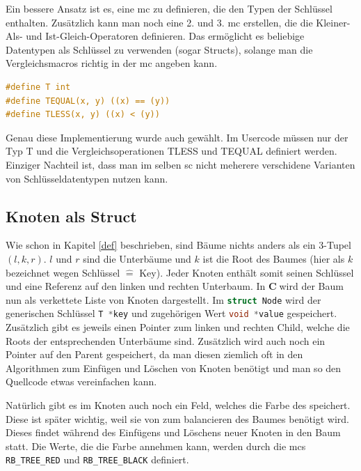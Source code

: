\documentclass[11pt]{article}
\newcommand{\lstin}[1]{\lstinline[language=C]{#1}}
\newcommand{\cpl}{\textbf{C}$\;$}
\begin{document}
Ein bessere Ansatz ist es, eine \gls{mc} zu definieren, die den Typen der Schlüssel enthalten. Zusätzlich kann man noch eine 2. und 3. \gls{mc} erstellen, die die Kleiner-Als- und Ist-Gleich-Operatoren definieren.
Das ermöglicht es beliebige Datentypen als Schlüssel zu verwenden (sogar Structs), solange man die Vergleichsmacros richtig in der \gls{mc} angeben kann.

\begin{lstlisting}[language=C]
#define T int
#define TEQUAL(x, y) ((x) == (y))
#define TLESS(x, y) ((x) < (y))
\end{lstlisting}

Genau diese Implementierung wurde auch gewählt. Im Usercode müssen nur der Typ T und die Vergleichsoperationen TLESS und TEQUAL definiert werden. Einziger Nachteil ist, dass man im selben \gls{sc} nicht meherere verschidene Varianten von Schlüsseldatentypen nutzen kann.

\subsection{Knoten als Struct}
Wie schon in Kapitel \ref{def} beschrieben, sind Bäume nichts anders als ein 3-Tupel $(l, k, r)$.
$l$ und $r$ sind die Unterbäume und $k$ ist die Root des Baumes (hier als $k$ bezeichnet wegen Schlüssel $\widehat{=}$ Key).
Jeder Knoten enthält somit seinen Schlüssel und eine Referenz auf den linken und rechten Unterbaum.
In \cpl wird der Baum nun als verkettete Liste von Knoten dargestellt.
Im \lstin{struct Node} wird der generischen Schlüssel \lstin{T *key} und zugehörigen Wert \lstin{void *value} gespeichert.
Zusätzlich gibt es jeweils einen Pointer zum linken und rechten Child, welche die Roots der entsprechenden Unterbäume sind. Zusätzlich wird auch noch ein Pointer auf den Parent gespeichert,
da man diesen ziemlich oft in den Algorithmen zum Einfügen und Löschen von Knoten benötigt und man so den Quellcode etwas vereinfachen kann.

Natürlich gibt es im Knoten auch noch ein Feld, welches die Farbe des speichert. Diese ist später wichtig, weil sie von zum balancieren des Baumes benötigt wird.
Dieses findet während des Einfügens und Löschens neuer Knoten in den Baum statt. Die Werte, die die Farbe annehmen kann, werden durch die \glspl{mc} \lstin{RB_TREE_RED} und \lstin{RB_TREE_BLACK} definiert.
\end{document}
